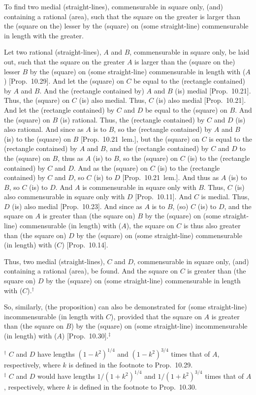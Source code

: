 \begin{Parallel}{}{}
{To find two medial (straight-lines),
commensurable in square only, (and) containing a rational (area), such that
the square on the greater is larger than the (square on the) lesser by the
(square) on (some straight-line) commensurable in length with the greater.

\epsfysize=1.6in
\centerline{}

Let two rational (straight-lines), $A$ and $B$, commensurable in square only, 
be laid out, such that the square on the greater $A$ is larger than the (square on
the) lesser $B$ by the (square) on (some straight-line) commensurable
in length with ($A$) [Prop.~10.29]. And let the
(square) on $C$ be equal to the (rectangle contained) by $A$ and $B$.
And the (rectangle contained by) $A$ and $B$ (is) medial [Prop.~10.21]. Thus, the (square) on $C$ (is)
also medial. Thus, $C$ (is) also medial [Prop.~10.21]. And let the (rectangle contained) by $C$ and $D$
be equal to the (square) on $B$. And the (square)
on $B$ (is) rational. Thus, the (rectangle contained) by $C$ and $D$ (is)
also rational. And since as $A$ is to $B$, so the (rectangle contained) by
$A$ and $B$ (is) to the (square) on $B$ [Prop.~10.21~lem.], but the (square) on $C$
is equal to the (rectangle contained) by $A$ and $B$,  
and the (rectangle contained) by $C$ and $D$ to the (square) on
$B$, thus as $A$ (is) to $B$,
so the (square) on $C$ (is) to the (rectangle contained) by $C$ and $D$.
And as the (square) on $C$ (is) to the (rectangle contained) by $C$ and $D$,
so $C$ (is) to $D$ [Prop.~10.21~lem.].
And thus as $A$ (is) to $B$, so $C$ (is) to $D$. And $A$ is commensurable
in square only with $B$. Thus, $C$ (is) also commensurable in square
only with $D$ [Prop.~10.11]. And $C$ is medial.
Thus, $D$ (is) also medial [Prop.~10.23]. 
And since as $A$ is to $B$, (so) $C$ (is) to $D$, and the square on $A$
is greater than (the square on) $B$ by the (square) on (some straight-line)
commensurable (in length) with ($A$), the square on $C$
is thus also greater than (the square on) $D$ by the (square) on (some straight-line)
commensurable (in length) with ($C$) [Prop.~10.14]. 

Thus, two medial (straight-lines), $C$ and $D$, 
commensurable in square only, (and) containing a rational (area), be found. And the square on $C$ is greater than (the square on) $D$ by the
(square) on (some straight-line) commensurable in length with ($C$).$^\dag$

So, similarly, (the proposition) can also be demonstrated for  (some straight-line) incommensurable
(in length with $C$), provided that the square on $A$ is greater than (the square on $B$) by the (square) on (some straight-line) incommensurable (in length) with ($A$) [Prop.~10.30].$^\ddag$}
\end{Parallel}
{\footnotesize\noindent$^\dag$ $C$ and $D$ have lengths $(1-k^2)^{1/4}$ and $(1-k^2)^{3/4}$ times that of $A$, respectively, where $k$ is defined in the
footnote to Prop.~10.29.\\[0.5ex]
$^\ddag$ $C$ and $D$ would have lengths $1/(1+k^2)^{1/4}$ and $1/(1+k^2)^{3/4}$ times that of $A$, respectively, where $k$ is defined in the footnote to  Prop.~10.30.}

